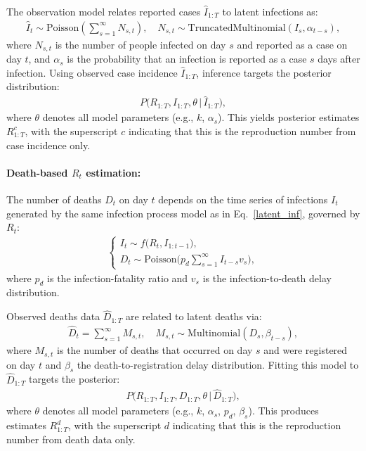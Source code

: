 \documentclass{article}
\begin{document}
The observation model relates reported cases $\widehat{I}_{1:T}$ to latent infections as:
\begin{align}\label{obs_inf}
\widehat{I}_t \sim \mathrm{Poisson}\left( \sum_{s=1}^\infty N_{s,t} \right), \quad N_{s,t} \sim \mathrm{TruncatedMultinomial}(I_s, \alpha_{t-s}),
\end{align}
where $N_{s,t}$ is the number of people infected on day $s$ and reported as a case on day $t$, and $\alpha_s$ is the probability that an infection is reported as a case $s$ days after infection. Using observed case incidence $\widehat{I}_{1:T}$, inference targets the posterior distribution:
\begin{align}
P\big(R_{1:T}, I_{1:T}, \theta \,\big|\, \widehat{I}_{1:T}\big),
\end{align}
where $\theta$ denotes all model parameters (e.g., $k$, $\alpha_s$). This yields posterior estimates $R_{1:T}^{c}$, with the superscript $c$ indicating that this is the reproduction number from case incidence only.

\paragraph{Death-based $R_{t}$ estimation:}
The number of deaths $D_t$ on day $t$ depends on the time series of infections $I_{t}$ generated by the same infection process model as in Eq.~\eqref{latent_inf}, governed by $R_{t}$:
\begin{align}\label{latent_death}
\begin{cases}
I_t \sim f\big(R_t, I_{1:t-1}\big),\\[4pt]
D_t \sim \mathrm{Poisson}\!\Big( p_d \sum_{s=1}^\infty I_{t-s} v_s \Big),
\end{cases}
\end{align}
where $p_d$ is the infection-fatality ratio and $v_s$ is the infection-to-death delay distribution.

Observed deaths data $\widehat{D}_{1:T}$ are related to latent deaths via:
\begin{align}\label{obs_death}
\widehat{D}_t = \sum_{s=1}^\infty M_{s,t}, \quad M_{s,t} \sim \mathrm{Multinomial}(D_s, \beta_{t-s}),
\end{align}
where $M_{s,t}$ is the number of deaths that occurred on day $s$ and were registered on day $t$ and $\beta_s$ the death-to-registration delay distribution.  
Fitting this model to $\widehat{D}_{1:T}$ targets the posterior:
\begin{align}
P\big(R_{1:T}, I_{1:T}, D_{1:T}, \theta \,\big|\, \widehat{D}_{1:T}\big),
\end{align}
where $\theta$ denotes all model parameters (e.g., $k$, $\alpha_s$, $p_d$, $\beta_s$).  
This produces estimates $R_{1:T}^d$, with the superscript $d$ indicating that this is the reproduction number from death data only.
\end{document}
